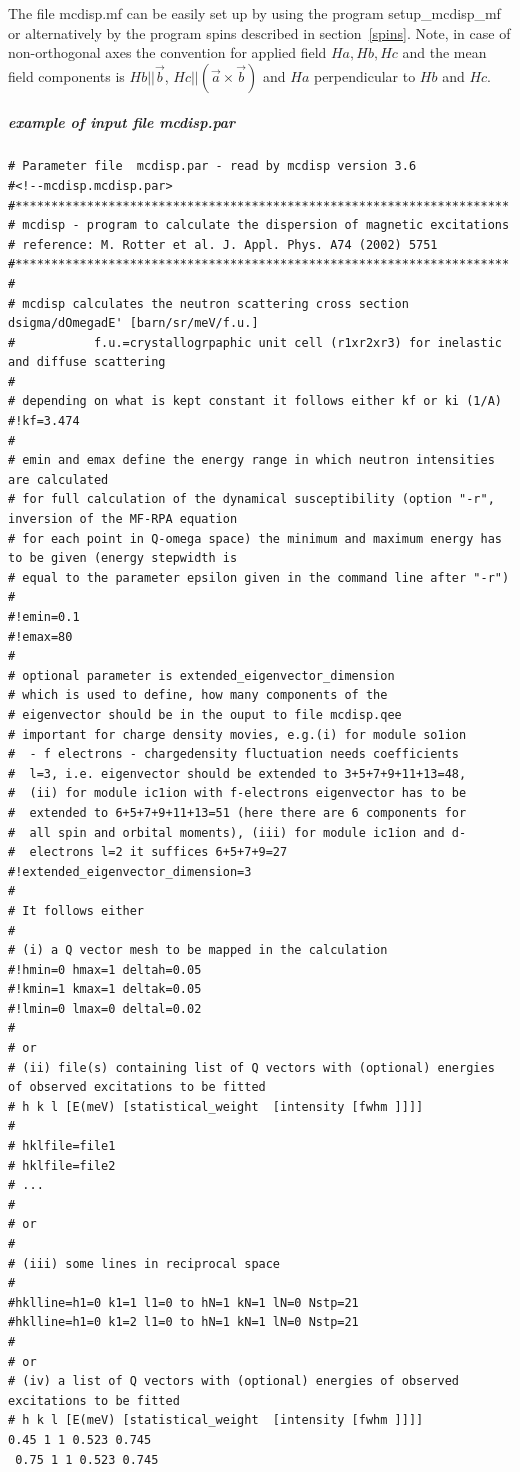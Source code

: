 The file {\prg mcdisp.mf} can be easily set up by using the program {\prg %
setup\_mcdisp\_mf} or alternatively by the program {\prg spins} 
described in section~\ref{spins}.
                            Note, in case of non-orthogonal axes the convention for applied field $Ha, Hb,Hc$ and
                            the mean field components
                            is $Hb||\vec b$, $Hc||(\vec a \times \vec b)$ and $Ha$ perpendicular to $Hb$ and $Hc$.

\subparagraph{example of input file {\prg mcdisp.par}}

{\footnotesize
\begin{verbatim}
# Parameter file  mcdisp.par - read by mcdisp version 3.6
#<!--mcdisp.mcdisp.par>
#*********************************************************************
# mcdisp - program to calculate the dispersion of magnetic excitations
# reference: M. Rotter et al. J. Appl. Phys. A74 (2002) 5751
#*********************************************************************
#
# mcdisp calculates the neutron scattering cross section dsigma/dOmegadE' [barn/sr/meV/f.u.]
#           f.u.=crystallogrpaphic unit cell (r1xr2xr3) for inelastic and diffuse scattering
#
# depending on what is kept constant it follows either kf or ki (1/A)
#!kf=3.474
# 
# emin and emax define the energy range in which neutron intensities are calculated
# for full calculation of the dynamical susceptibility (option "-r", inversion of the MF-RPA equation 
# for each point in Q-omega space) the minimum and maximum energy has to be given (energy stepwidth is 
# equal to the parameter epsilon given in the command line after "-r")
#
#!emin=0.1
#!emax=80
#
# optional parameter is extended_eigenvector_dimension
# which is used to define, how many components of the
# eigenvector should be in the ouput to file mcdisp.qee
# important for charge density movies, e.g.(i) for module so1ion
#  - f electrons - chargedensity fluctuation needs coefficients
#  l=3, i.e. eigenvector should be extended to 3+5+7+9+11+13=48,
#  (ii) for module ic1ion with f-electrons eigenvector has to be
#  extended to 6+5+7+9+11+13=51 (here there are 6 components for 
#  all spin and orbital moments), (iii) for module ic1ion and d-
#  electrons l=2 it suffices 6+5+7+9=27 
#!extended_eigenvector_dimension=3
#
# It follows either 
#
# (i) a Q vector mesh to be mapped in the calculation
#!hmin=0 hmax=1 deltah=0.05
#!kmin=1 kmax=1 deltak=0.05
#!lmin=0 lmax=0 deltal=0.02
#
# or 
# (ii) file(s) containing list of Q vectors with (optional) energies of observed excitations to be fitted
# h k l [E(meV) [statistical_weight  [intensity [fwhm ]]]]
#
# hklfile=file1
# hklfile=file2
# ...
#
# or
#
# (iii) some lines in reciprocal space 
#
#hklline=h1=0 k1=1 l1=0 to hN=1 kN=1 lN=0 Nstp=21
#hklline=h1=0 k1=2 l1=0 to hN=1 kN=1 lN=0 Nstp=21
#
# or
# (iv) a list of Q vectors with (optional) energies of observed excitations to be fitted
# h k l [E(meV) [statistical_weight  [intensity [fwhm ]]]]
0.45 1 1 0.523 0.745
 0.75 1 1 0.523 0.745

\end{verbatim}
}

